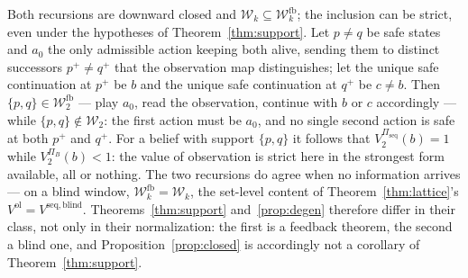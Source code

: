 

\begin{remark}\label{rem:feedback-strict}
Both recursions are downward closed and
\(\mathcal{W}_{k} \subseteq \mathcal{W}^{\mathrm{fb}}_{k}\); the
inclusion can be strict, even under the hypotheses of
Theorem~\ref{thm:support}. Let \(p \neq q\) be safe states and
\(a_{0}\) the only admissible action keeping both alive, sending them to
distinct successors \(p^{+} \neq q^{+}\) that the observation map
distinguishes; let the unique safe continuation at \(p^{+}\) be \(b\) and
the unique safe continuation at \(q^{+}\) be \(c \neq b\). Then
\(\{p,q\} \in \mathcal{W}^{\mathrm{fb}}_{2}\) --- play \(a_{0}\), read the
observation, continue with \(b\) or \(c\) accordingly --- while
\(\{p,q\} \notin \mathcal{W}_{2}\): the first action must be \(a_{0}\),
and no single second action is safe at both \(p^{+}\) and \(q^{+}\). For
a belief with support \(\{p,q\}\) it follows that
\(V^{\Pi_{\mathrm{seq}}}_{2}(b) = 1\) while \(V^{\Pi_{B}}_{2}(b) < 1\):
the value of observation is strict here in the strongest form available,
all or nothing. The two recursions do agree when no information arrives ---
on a blind window, \(\mathcal{W}^{\mathrm{fb}}_{k} = \mathcal{W}_{k}\),
the set-level content of Theorem~\ref{thm:lattice}'s
\(V^{\mathrm{ol}} = V^{\mathrm{seq,blind}}\). Theorems~\ref{thm:support}
and~\ref{prop:degen} therefore differ in their class, not only in their
normalization: the first is a feedback theorem, the second a blind one, and
Proposition~\ref{prop:closed} is accordingly not a corollary of
Theorem~\ref{thm:support}.
\end{remark}



